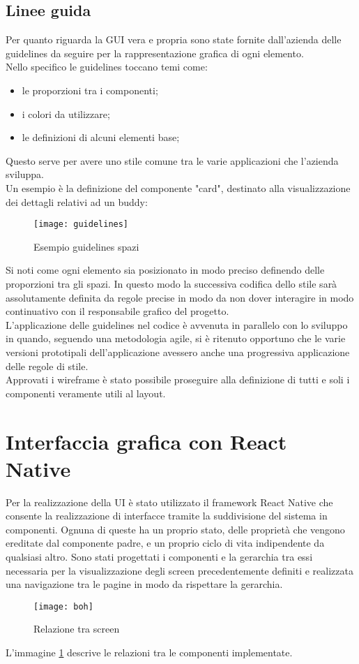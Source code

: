 \subsection{Linee guida}
Per quanto riguarda la GUI vera e propria sono state fornite dall'azienda delle 
guidelines da seguire per la rappresentazione grafica di ogni elemento. \\
Nello specifico le guidelines toccano temi come:
\begin{itemize}
	\item le proporzioni tra i componenti;
	\item i colori da utilizzare;
	\item le definizioni di alcuni elementi base;
\end{itemize}
Questo serve per avere uno stile comune tra le varie applicazioni che 
l'azienda sviluppa. \\
Un esempio è la definizione del componente "card", destinato alla 
visualizzazione dei dettagli relativi ad un buddy:
\begin{figure}[H] 
	\centering
	\texttt{[image: guidelines]}
	\caption{Esempio guidelines spazi}
\end{figure}
Si noti come ogni elemento sia posizionato in modo preciso definendo delle 
proporzioni tra gli spazi. In questo modo la successiva codifica dello stile sarà 
assolutamente definita da regole precise in modo da non dover interagire in modo 
continuativo con il responsabile grafico del progetto. \\
L'applicazione delle guidelines nel codice è avvenuta in parallelo con lo sviluppo 
in quando, seguendo una metodologia agile, si è ritenuto opportuno che le varie 
versioni prototipali dell'applicazione avessero anche una progressiva applicazione 
delle regole di stile.\\
Approvati i wireframe è stato possibile proseguire alla definizione di tutti 
e soli i componenti veramente utili al layout.

\section{Interfaccia grafica con React Native}
Per la realizzazione della UI è stato utilizzato il framework React Native che consente la realizzazione di interfacce tramite la suddivisione del sistema in componenti. Ognuna di queste ha un proprio stato, delle proprietà che vengono ereditate dal componente padre, e un proprio ciclo di vita indipendente da qualsiasi altro.
\newline
Sono stati progettati i componenti e la gerarchia tra essi necessaria per la visualizzazione degli screen precedentemente definiti e realizzata una navigazione tra le pagine in modo da rispettare la gerarchia.
\begin{figure}[H] 
	\centering
	\texttt{[image: boh]}
	\caption{Relazione tra screen}
	\label{gerarchiaRN}
\end{figure}
L'immagine \ref{gerarchiaRN} descrive le relazioni tra le componenti implementate.

